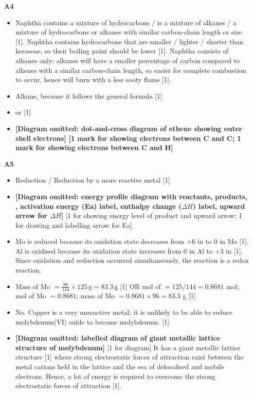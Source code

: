 \documentclass[11pt]{exam}
\begin{document}
\textbf{A4}
\begin{itemize}
\item[(a)] Naphtha contains a mixture of hydrocarbons / is a mixture of alkanes / a mixture of hydrocarbons or alkanes with similar carbon-chain length or size [1]. Naphtha contains hydrocarbons that are smaller / lighter / shorter than kerosene, so their boiling point should be lower [1]. Naphtha consists of alkanes only; alkanes will have a smaller percentage of carbon compared to alkenes with a similar carbon-chain length, so easier for complete combustion to occur, hence will burn with a less sooty flame [1].

\item[(b)(i)] Alkane, because it follows the general formula  [1]

\item[(b)(ii)]  or  [1]

\item[(c)] \textbf{[Diagram omitted: dot-and-cross diagram of ethene showing outer shell electrons] \hfill [1 mark for showing electrons between C and C; 1 mark for showing electrons between C and H]}
\end{itemize}

\textbf{A5}
\begin{itemize}
\item[(a)] Reduction / Reduction by a more reactive metal [1]

\item[(b)] \textbf{[Diagram omitted: energy profile diagram with reactants, products, , activation energy (Ea) label, enthalpy change ($\Delta H$) label, upward arrow for $\Delta H$]}
\hfill [1 for showing energy level of product and upward arrow; 1 for drawing and labelling arrow for Ea]

\item[(c)] Mo is reduced because its oxidation state decreases from +6 in  to 0 in Mo [1]. Al is oxidised because its oxidation state increases from 0 in Al to +3 in  [1]. Since oxidation and reduction occurred simultaneously, the reaction is a redox reaction.

\item[(d)] Mass of Mo $= \frac{96}{144} \times 125\,\text{g} = 83.3\,\text{g}$ [1] \hfill OR \hfill mol of  $= 125/144 = 0.8681$ mol; mol of Mo $= 0.8681$; mass of Mo $= 0.8681 \times 96 = 83.3$ g [1]

\item[(e)] No. Copper is a very unreactive metal; it is unlikely to be able to reduce molybdenum(VI) oxide to become molybdenum. [1]

\item[(f)] \textbf{[Diagram omitted: labelled diagram of giant metallic lattice structure of molybdenum]}
\hfill [1 for diagram]
It has a giant metallic lattice structure [1] where strong electrostatic forces of attraction exist between the metal cations held in the lattice and the sea of delocalised and mobile electrons. Hence, a lot of energy is required to overcome the strong electrostatic forces of attraction [1].
\end{itemize}
\end{document}
